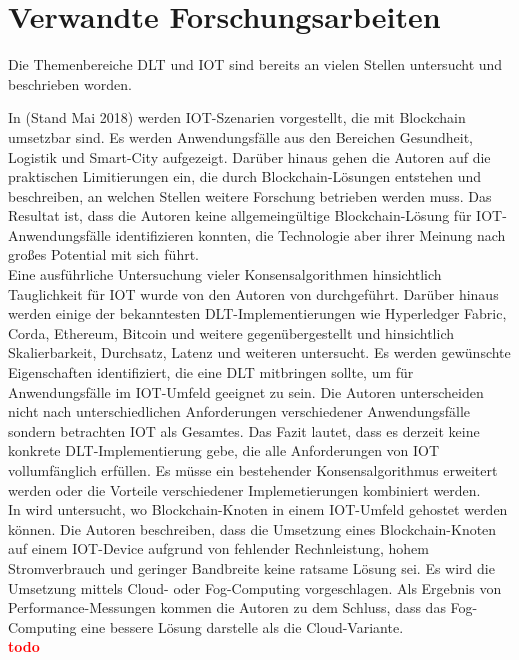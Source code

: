 \chapter{Verwandte Forschungsarbeiten}
\label{ch:relatedwork}
Die Themenbereiche \ac{DLT} und \ac{IOT} sind bereits an vielen Stellen untersucht und beschrieben worden.

In \cite{Review2018} (Stand Mai 2018) werden \ac{IOT}-Szenarien vorgestellt, die mit Blockchain umsetzbar sind. Es werden Anwendungsfälle aus den Bereichen Gesundheit, Logistik und Smart-City aufgezeigt. Darüber hinaus gehen die Autoren auf die praktischen Limitierungen ein, die durch Blockchain-Lösungen entstehen und beschreiben, an welchen Stellen weitere Forschung betrieben werden muss. Das Resultat ist, dass die Autoren keine allgemeingültige Blockchain-Lösung für \ac{IOT}-Anwendungsfälle identifizieren konnten, die Technologie aber ihrer Meinung nach großes Potential mit sich führt.\\

Eine ausführliche Untersuchung vieler Konsensalgorithmen hinsichtlich Tauglichkeit für \ac{IOT} wurde von den Autoren von \cite{Salimitari2018ASO} durchgeführt. Darüber hinaus werden einige der bekanntesten DLT-Implementierungen wie Hyperledger Fabric, Corda, Ethereum, Bitcoin und weitere gegenübergestellt und hinsichtlich Skalierbarkeit, Durchsatz, Latenz und weiteren untersucht. Es werden gewünschte Eigenschaften identifiziert, die eine \ac{DLT} mitbringen sollte, um für Anwendungsfälle im \ac{IOT}-Umfeld geeignet zu sein. Die Autoren unterscheiden nicht nach unterschiedlichen Anforderungen verschiedener Anwendungsfälle sondern betrachten \ac{IOT} als Gesamtes. Das Fazit lautet, dass es derzeit keine konkrete \ac{DLT}-Implementierung gebe, die alle Anforderungen von \ac{IOT} vollumfänglich erfüllen. Es müsse ein bestehender Konsensalgorithmus erweitert werden oder die Vorteile verschiedener Implemetierungen kombiniert werden.\\

In \cite{BaaS2016} wird untersucht, wo Blockchain-Knoten in einem \ac{IOT}-Umfeld gehostet werden können. Die Autoren beschreiben, dass die Umsetzung eines Blockchain-Knoten auf einem \ac{IOT}-Device aufgrund von fehlender Rechnleistung, hohem Stromverbrauch und geringer Bandbreite keine ratsame Lösung sei. Es wird die Umsetzung mittels Cloud- oder Fog-Computing vorgeschlagen. Als Ergebnis von Performance-Messungen kommen die Autoren zu dem Schluss, dass das Fog-Computing eine bessere Lösung darstelle als die Cloud-Variante.\\


\cite{evrythng2017}
\cite{Eval2018}
\cite{convergence2019}
\cite{REYNA2018173}
\textbf{\textcolor{red}{todo}}
